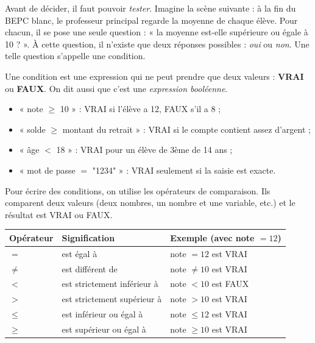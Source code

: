 \documentclass[11pt]{article}
\newcommand{\cle}[1]{{\popxbold\color{popdark}#1}}
\begin{document}
Avant de décider, il faut pouvoir \emph{tester}. Imagine la scène suivante : à la fin du BEPC blanc, le professeur principal regarde la moyenne de chaque élève. Pour chacun, il se pose une seule question : « la moyenne est-elle supérieure ou égale à 10 ? ». À cette question, il n'existe que deux réponses possibles : \emph{oui} ou \emph{non}. Une telle question s'appelle une \cle{condition}.

\begin{definition}[Condition]
Une \cle{condition} est une expression qui ne peut prendre que deux valeurs : \textbf{VRAI} ou \textbf{FAUX}. On dit aussi que c'est une \emph{expression booléenne}.
\end{definition}

\begin{exemplebox}
\begin{itemize}
\item « note $\geq$ 10 » : VRAI si l'élève a 12, FAUX s'il a 8 ;
\item « solde $\geq$ montant du retrait » : VRAI si le compte contient assez d'argent ;
\item « âge $<$ 18 » : VRAI pour un élève de 3ème de 14 ans ;
\item « mot de passe $=$ "1234" » : VRAI seulement si la saisie est exacte.
\end{itemize}
\end{exemplebox}

Pour écrire des conditions, on utilise les \cle{opérateurs de comparaison}. Ils comparent deux valeurs (deux nombres, un nombre et une variable, etc.) et le résultat est VRAI ou FAUX.

\begin{center}
\begin{tabularx}{\linewidth}{|l|X|X|}
\hline
\rowcolor{popblueL} \textbf{Opérateur} & \textbf{Signification} & \textbf{Exemple (avec note $= 12$)} \\
\hline
$=$ & est égal à & note $= 12$ est VRAI \\
\hline
$\neq$ & est différent de & note $\neq 10$ est VRAI \\
\hline
$<$ & est strictement inférieur à & note $< 10$ est FAUX \\
\hline
$>$ & est strictement supérieur à & note $> 10$ est VRAI \\
\hline
$\leq$ & est inférieur ou égal à & note $\leq 12$ est VRAI \\
\hline
$\geq$ & est supérieur ou égal à & note $\geq 10$ est VRAI \\
\hline
\end{tabularx}
\end{center}
\end{document}
